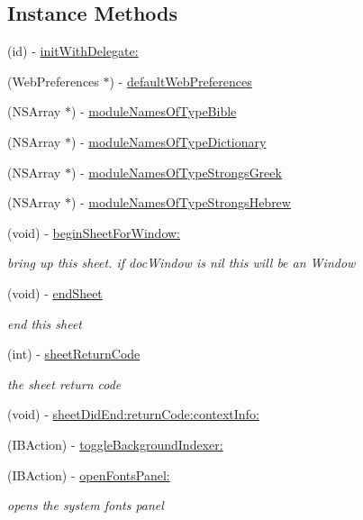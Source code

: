 \subsection*{Instance Methods}
\begin{DoxyCompactItemize}
\item 
(id) -\/ \hyperlink{interface_m_b_preference_controller_a31987d71b58e0520588676a4f6896d2c}{init\-With\-Delegate\-:}
\item 
(Web\-Preferences $\ast$) -\/ \hyperlink{interface_m_b_preference_controller_ab3f268e47b895d33f1af584d308f2061}{default\-Web\-Preferences}
\item 
(N\-S\-Array $\ast$) -\/ \hyperlink{interface_m_b_preference_controller_a50822a6b4a4bb62947fc656fb343c23e}{module\-Names\-Of\-Type\-Bible}
\item 
(N\-S\-Array $\ast$) -\/ \hyperlink{interface_m_b_preference_controller_a9c6a2cd9b3428d154f9880a52d87a98f}{module\-Names\-Of\-Type\-Dictionary}
\item 
(N\-S\-Array $\ast$) -\/ \hyperlink{interface_m_b_preference_controller_a21847f01545eded49b9bd62c7f7fd7c1}{module\-Names\-Of\-Type\-Strongs\-Greek}
\item 
(N\-S\-Array $\ast$) -\/ \hyperlink{interface_m_b_preference_controller_ac965b23e462739e1a4e67d9d2fcca67f}{module\-Names\-Of\-Type\-Strongs\-Hebrew}
\item 
(void) -\/ \hyperlink{interface_m_b_preference_controller_a5ffece74583930f9d76d8f1e9caf4514}{begin\-Sheet\-For\-Window\-:}
\begin{DoxyCompactList}\small\item\em bring up this sheet. if doc\-Window is nil this will be an Window \end{DoxyCompactList}\item 
(void) -\/ \hyperlink{interface_m_b_preference_controller_ad73bf69ade5214ad7f61681509587167}{end\-Sheet}
\begin{DoxyCompactList}\small\item\em end this sheet \end{DoxyCompactList}\item 
(int) -\/ \hyperlink{interface_m_b_preference_controller_ae127de758d9bcd83bc2ddc2d8f4234c6}{sheet\-Return\-Code}
\begin{DoxyCompactList}\small\item\em the sheet return code \end{DoxyCompactList}\item 
(void) -\/ \hyperlink{interface_m_b_preference_controller_aee63616e91e1e8e9c103fbbdbd2b225e}{sheet\-Did\-End\-:return\-Code\-:context\-Info\-:}
\item 
(I\-B\-Action) -\/ \hyperlink{interface_m_b_preference_controller_a55957e9828dfff87f60ce865dc586901}{toggle\-Background\-Indexer\-:}
\item 
(I\-B\-Action) -\/ \hyperlink{interface_m_b_preference_controller_afd8c10f9452e99f09b154e338773013b}{open\-Fonts\-Panel\-:}
\begin{DoxyCompactList}\small\item\em opens the system fonts panel \end{DoxyCompactList}\end{DoxyCompactItemize}
